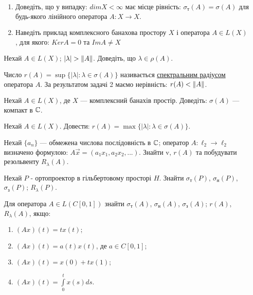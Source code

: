 \begin{exercise}
    \begin{enumerate}
        \item Доведіть, що у випадку: $dim X < \infty$ має місце рівність: 
        $\sigma_\text{т}(A) = \sigma(A)$ для будь-якого лінійного оператора 
        $A: X \rightarrow X$.
        \item Наведіть приклад комплексного банахова простору $X$ і 
        оператора $A \in L(X)$, для якого: $Ker A = {0}$ та $Im A \neq X$
    \end{enumerate}
\end{exercise}

\begin{exercise}
    Нехай $A \in L(X)$; $|\lambda| > \left\lVert A\right\rVert$. Доведіть, що $\lambda \in 
    \rho(A)$.
\end{exercise}

\begin{theory}
    Число $r(A) = \sup\{|\lambda| : \lambda \in \sigma(A)\}$ називається 
    \ul{спектральним радіусом} оператора $A$. За результатом задачі 2 
    маємо нерівність: $r(A) < \left\lVert A\right\rVert$.
\end{theory}

\begin{exercise}
    Нехай $A \in L(X)$, де $X$ --- комплексний банахів простір. Доведіть: 
    $\sigma(A)$ --- компакт в $\mathbb{C}$.
\end{exercise}

\begin{exercise}
    Нехай $A \in L(X)$. Довести: $r(A) = \max\{|\lambda| : \lambda \in \sigma(A)\}$.
\end{exercise}

\begin{exercise}
    Нехай $\{a_n\}$ --- обмежена числова послідовність в $\mathbb{C}$; оператор $A: \ell_2 
    \rightarrow \ell_2$ визначено формулою: $A\vec{x} = (a_1 x_1, a_2 x_2, ...)$. 
    Знайти v, $r(A)$ та 
    побудувати резольвенту $R_\lambda (A)$.
\end{exercise}

\begin{exercise}
    Нехай $P$ - ортопроектор в гільбертовому просторі $H$. Знайти 
    $\sigma_\text{т}(P)$, $\sigma_\text{н}(P)$, $\sigma_\text{з}(P)$; $R_\lambda(P)$.
\end{exercise}

\begin{exercise}
    Для оператора $A \in L(C[0, 1])$ знайти 
    $\sigma_\text{т}(A)$, $\sigma_\text{н}(A)$, $\sigma_\text{з}(A)$; $r(A)$, $R_\lambda(A)$, 
    якщо:
    \begin{enumerate}
        \item $(Ax)(t) = tx(t)$;
        \item $(Ax)(t) = a(t)x(t)$, де $a \in C[0, 1]$;
        \item $(Ax)(t) = x(0) + tx(1)$;
        \item $(Ax)(t) = \int\limits_0^t x(s) ds$.
    \end{enumerate}
\end{exercise}

